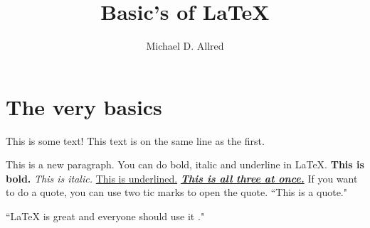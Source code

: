 \documentclass{article}
\title{Basic's of LaTeX}
\author{Michael D. Allred}
\begin{document}
\maketitle

\section{The very basics}

This is some text!
This text is on the same line as the first.

This is a new paragraph. You can do bold, italic and underline in LaTeX. \textbf{This is bold.} \textit{This is italic.} \underline{This is underlined.} \textbf{\textit{\underline{This is all three at once.}}} If you want to do a quote, you can use two tic marks to open the quote. ``This is a quote."

``LaTeX is great and everyone should use it \parencite{allred21}." 


\printbibliography
\end{document}
